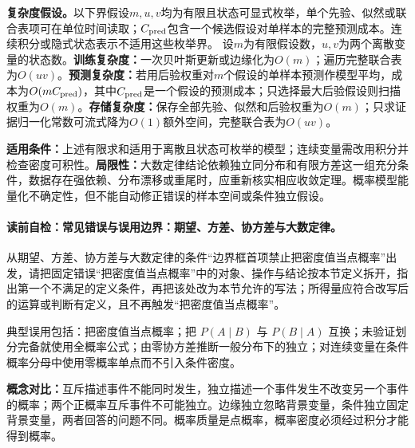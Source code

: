 \begin{complexitybox}
\textbf{复杂度假设。}以下界假设$m,u,v$均为有限且状态可显式枚举，单个先验、似然或联合表项可在单位时间读取；$C_{\rm pred}$包含一个候选假设对单样本的完整预测成本。连续积分或隐式状态表示不适用这些枚举界。
设$m$为有限假设数，$u,v$为两个离散变量的状态数。\textbf{训练复杂度：}一次贝叶斯更新或边缘化为$O(m)$；遍历完整联合表为$O(uv)$。\textbf{预测复杂度：}若用后验权重对$m$个假设的单样本预测作模型平均，成本为$O(mC_{\rm pred})$，其中$C_{\rm pred}$是一个假设的预测成本；只选择最大后验假设则扫描权重为$O(m)$。\textbf{存储复杂度：}保存全部先验、似然和后验权重为$O(m)$；只求证据归一化常数可流式降为$O(1)$额外空间，完整联合表为$O(uv)$。
\end{complexitybox}

\label{struct:V1-C04-CH30}
\label{struct:V1-C04-CH31}
\begin{applicabilitybox}
\textbf{适用条件：}上述有限求和适用于离散且状态可枚举的模型；连续变量需改用积分并检查密度可积性。\textbf{局限性：}大数定律结论依赖独立同分布和有限方差这一组充分条件，数据存在强依赖、分布漂移或重尾时，应重新核实相应收敛定理。概率模型能量化不确定性，但不能自动修正错误的样本空间或条件独立假设。
\end{applicabilitybox}

\label{struct:V1-C04-CH32}
\paragraph{读前自检：常见错误与误用边界：期望、方差、协方差与大数定律。}从期望、方差、协方差与大数定律的条件“边界框首项禁止把密度值当点概率”出发，请把固定错误“把密度值当点概率”中的对象、操作与结论按本节定义拆开，指出第一个不满足的定义条件，再把该处改为本节允许的写法；所得量应符合改写后的运算或判断有定义，且不再触发“把密度值当点概率”。\par

\begin{warningbox}
典型误用包括：把密度值当点概率；把 $P(A\mid B)$ 与 $P(B\mid A)$ 互换；未验证划分完备就使用全概率公式；由零协方差推断一般分布下的独立；对连续变量在条件概率分母中使用零概率单点而不引入条件密度。
\end{warningbox}

\label{struct:V1-C04-CH33}
\begin{comparisonbox}
\textbf{概念对比：}互斥描述事件不能同时发生，独立描述一个事件发生不改变另一个事件的概率；两个正概率互斥事件不可能独立。边缘独立忽略背景变量，条件独立固定背景变量，两者回答的问题不同。概率质量是点概率，概率密度必须经过积分才能得到概率。
\end{comparisonbox}

